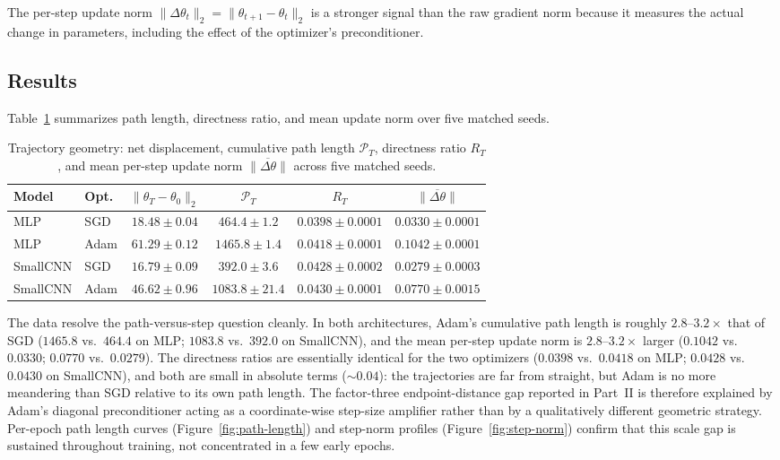 The per-step update norm $\|\Delta\theta_t\|_2 = \|\theta_{t+1}-\theta_t\|_2$ is a stronger signal than the raw gradient norm because it measures the actual change in parameters, including the effect of the optimizer's preconditioner.

\subsection{Results}

Table~\ref{tab:path-length} summarizes path length, directness ratio, and mean update norm over five matched seeds.

\begin{table}[H]
\centering
\small
\setlength{\tabcolsep}{4pt}
\begin{tabular}{llcccc}
\toprule
\textbf{Model} & \textbf{Opt.} & $\|\theta_T-\theta_0\|_2$ & $\mathcal{P}_T$ & $R_T$ & $\overline{\|\Delta\theta\|}$ \\
\midrule
MLP      & SGD  & $18.48 \pm 0.04$  & $464.4 \pm 1.2$    & $0.0398 \pm 0.0001$ & $0.0330 \pm 0.0001$ \\
MLP      & Adam & $61.29 \pm 0.12$  & $1465.8 \pm 1.4$   & $0.0418 \pm 0.0001$ & $0.1042 \pm 0.0001$ \\
SmallCNN & SGD  & $16.79 \pm 0.09$  & $392.0 \pm 3.6$    & $0.0428 \pm 0.0002$ & $0.0279 \pm 0.0003$ \\
SmallCNN & Adam & $46.62 \pm 0.96$  & $1083.8 \pm 21.4$  & $0.0430 \pm 0.0001$ & $0.0770 \pm 0.0015$ \\
\bottomrule
\end{tabular}
\caption{Trajectory geometry: net displacement, cumulative path length $\mathcal{P}_T$, directness ratio $R_T$, and mean per-step update norm $\overline{\|\Delta\theta\|}$ across five matched seeds.}
\label{tab:path-length}
\end{table}

The data resolve the path-versus-step question cleanly. In both architectures, Adam's cumulative path length is roughly $2.8$--$3.2\times$ that of SGD ($1465.8$ vs.\ $464.4$ on MLP; $1083.8$ vs.\ $392.0$ on SmallCNN), and the mean per-step update norm is $2.8$--$3.2\times$ larger ($0.1042$ vs.\ $0.0330$; $0.0770$ vs.\ $0.0279$). The directness ratios are essentially identical for the two optimizers ($0.0398$ vs.\ $0.0418$ on MLP; $0.0428$ vs.\ $0.0430$ on SmallCNN), and both are small in absolute terms ($\sim 0.04$): the trajectories are far from straight, but Adam is no more meandering than SGD relative to its own path length. The factor-three endpoint-distance gap reported in Part~II is therefore explained by Adam's diagonal preconditioner acting as a coordinate-wise step-size amplifier rather than by a qualitatively different geometric strategy. Per-epoch path length curves (Figure~\ref{fig:path-length}) and step-norm profiles (Figure~\ref{fig:step-norm}) confirm that this scale gap is sustained throughout training, not concentrated in a few early epochs.

